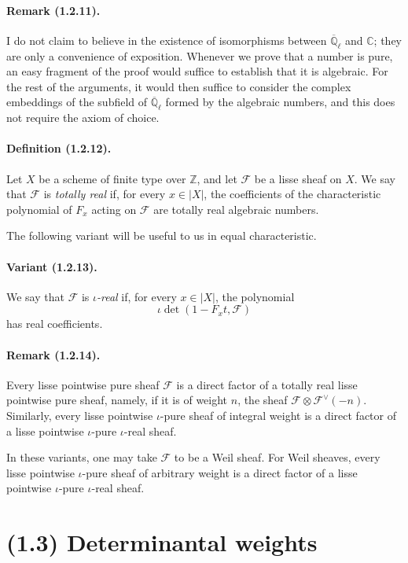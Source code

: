 \documentclass[11pt]{article}
\theoremstyle{remark}
\newcommand{\Qlb}{\overline{\mathbb{Q}}_\ell}
\newcommand{\ZZ}{\mathbb{Z}}
\newcommand{\CC}{\mathbb{C}}
\begin{document}
\paragraph{Remark (1.2.11).} I do not claim to believe in the existence of isomorphisms between $\Qlb$ and $\CC$; they are only a convenience of exposition. Whenever we prove that a number is pure, an easy fragment of the proof would suffice to establish that it is algebraic. For the rest of the arguments, it would then suffice to consider the complex embeddings of the subfield of $\Qlb$ formed by the algebraic numbers, and this does not require the axiom of choice.

\paragraph{Definition (1.2.12).} Let $X$ be a scheme of finite type over $\ZZ$, and let $\mathcal F$ be a lisse sheaf on $X$. We say that $\mathcal F$ is \emph{totally real} if, for every $x\in |X|$, the coefficients of the characteristic polynomial of $F_x$ acting on $\mathcal F$ are totally real algebraic numbers.

The following variant will be useful to us in equal characteristic.

\paragraph{Variant (1.2.13).} We say that $\mathcal F$ is \emph{$\iota$-real} if, for every $x\in |X|$, the polynomial
\[
\iota\det(1-F_x t,\mathcal F)
\]
has real coefficients.

\paragraph{Remark (1.2.14).} Every lisse pointwise pure sheaf $\mathcal F$ is a direct factor of a totally real lisse pointwise pure sheaf, namely, if it is of weight $n$, the sheaf $\mathcal F\otimes\mathcal F^\vee(-n)$. Similarly, every lisse pointwise $\iota$-pure sheaf of integral weight is a direct factor of a lisse pointwise $\iota$-pure $\iota$-real sheaf.

In these variants, one may take $\mathcal F$ to be a Weil sheaf. For Weil sheaves, every lisse pointwise $\iota$-pure sheaf of arbitrary weight is a direct factor of a lisse pointwise $\iota$-pure $\iota$-real sheaf.

\section*{(1.3) Determinantal weights}
\end{document}
